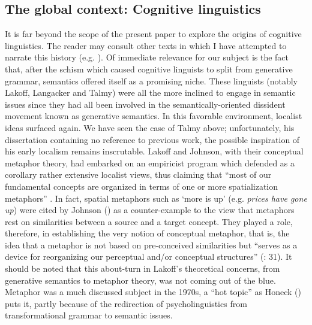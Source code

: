 \documentclass[output=paper]{langscibook}
\begin{document}
\subsection{The global context: Cognitive linguistics}

It is far beyond the scope of the present paper to explore the origins of cognitive linguistics. The reader may consult other texts in which I have attempted to narrate this history (e.g. \citealt{arigne_generative_2015}). Of immediate relevance for our subject is the fact that, after the schism which caused cognitive linguists to split from generative grammar, semantics offered itself as a promising niche. These linguists (notably Lakoff, Langacker and Talmy) were all the more inclined to engage in semantic issues since they had all been involved in the semantically-oriented dissident movement known as generative semantics. In this favorable environment, localist ideas surfaced again. We have seen the case of Talmy above; unfortunately, his dissertation containing no reference to previous work, the possible inspiration of his early localism remains inscrutable. Lakoff and Johnson, with their conceptual metaphor theory, had embarked on an empiricist program which defended as a corollary rather extensive localist views, thus claiming that “most of our fundamental concepts are organized in terms of one or more spatialization metaphors” \citep[17]{lakoff_metaphors_1980}. In fact, spatial metaphors such as ‘more is up’ (e.g. \textit{prices have gone up}) were cited by Johnson (\citeyear{johnson_introduction:_1981}) as a counter-example to the view that metaphors rest on similarities between a source and a target concept. They played a role, therefore, in establishing the very notion of conceptual metaphor, that is, the idea that a metaphor is not based on pre-conceived similarities but “serves as a device for reorganizing our perceptual and\slash or conceptual structures” (\citealt{johnson_introduction:_1981}: 31). It should be noted that this about-turn in Lakoff’s theoretical concerns, from generative semantics to metaphor theory, was not coming out of the blue. Metaphor was a much discussed subject in the 1970s, a “hot topic” as Honeck (\citeyear{honeck_historical_1980}) puts it, partly because of the redirection of psycholinguistics from transformational grammar to semantic issues.
\end{document}
